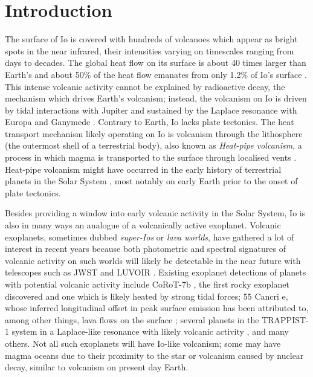 \documentclass[modern]{aastex62}
\begin{document}
\section{Introduction}
The surface of Io is covered with hundreds of volcanoes which appear as bright spots in the near infrared, their intensities varying on timescales ranging from days to decades.
The global heat flow on its surface is about 40 times larger than Earth's \citep{breuer2007,davies2010} and about 50\% of the heat flow emanates from only 1.2\% of Io's surface \citep{veeder2012}.
This intense volcanic activity cannot be explained by radioactive decay, the mechanism which drives Earth's volcanism; instead, the volcanism on Io is driven by tidal interactions with Jupiter and sustained by the Laplace resonance with Europa and Ganymede \citep{peale1979}.
Contrary to Earth, Io lacks plate tectonics.
The heat transport mechanism likely operating on Io is volcanism through the lithosphere (the outermost shell of a terrestrial body), also known as \emph{Heat-pipe volcanism}, a process in which magma is transported to the surface through localised vents \citep{oreilly1981}.
Heat-pipe volcanism might have occurred in the early history of terrestrial planets in the Solar System \citep{moore2013,moore2017}, most notably on early Earth prior to the onset of plate tectonics.

Besides providing a window into early volcanic activity in the Solar System, Io is also in many ways an analogue of a volcanically active exoplanet.
Volcanic exoplanets, sometimes dubbed \emph{super-Ios} or \emph{lava worlds}, have gathered a lot of interest in recent years because both photometric and spectral signatures of volcanic activity on such worlds will likely be detectable in the near future with telescopes such as JWST and LUVOIR \citep{kaltenegger2010,henning2018,oza2019,chao2020}.
Existing exoplanet detections of planets with potential volcanic activity include CoRoT-7b \citep{barnes2010}, the first rocky exoplanet discovered and one which is likely heated by strong tidal forces; 55 Cancri e, whose inferred longitudinal offset in peak surface emission has been attributed to, among other things, lava flows on the surface \citep{demory2016,demory2016d,hammond2017}; several planets in the TRAPPIST-1 system in a Laplace-like resonance with likely volcanic activity \citep{kislyakova2017,dobos2019}, and many others.
Not all such exoplanets will have Io-like volcanism; some may have magma oceans due to their proximity to the star or volcanism caused by nuclear decay, similar to volcanism on present day Earth.
\end{document}
